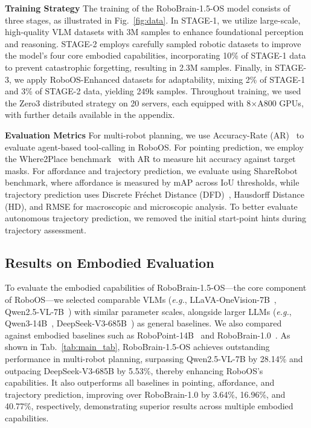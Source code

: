 \textbf{Training Strategy}  
The training of the RoboBrain-1.5-OS model consists of three stages, as illustrated in Fig.~\ref{fig:data}. In STAGE-1, we utilize large-scale, high-quality VLM datasets with 3M samples to enhance foundational perception and reasoning. STAGE-2 employs carefully sampled robotic datasets to improve the model's four core embodied capabilities, incorporating 10\% of STAGE-1 data to prevent catastrophic forgetting, resulting in 2.3M samples. Finally, in STAGE-3, we apply RoboOS-Enhanced datasets for adaptability, mixing 2\% of STAGE-1 and 3\% of STAGE-2 data, yielding 249k samples. Throughout training, we used the Zero3 \cite{zero} distributed strategy on 20 servers, each equipped with 8$\times$A800 GPUs, with further details available in the appendix.

\textbf{Evaluation Metrics} For multi-robot planning, we use Accuracy-Rate (AR)~\cite{zhang2024lmms} to evaluate agent-based tool-calling in RoboOS. For pointing prediction, we employ the Where2Place benchmark~\cite{yuan2024robopoint} with AR to measure hit accuracy against target masks. For affordance and trajectory prediction, we evaluate using ShareRobot~\cite{ji2025robobrain} benchmark, where affordance is measured by mAP across IoU thresholds, while trajectory prediction uses Discrete Fréchet Distance (DFD)~\cite{gu2023rt}, Hausdorff Distance (HD), and RMSE for macroscopic and microscopic analysis. To better evaluate autonomous trajectory prediction, we removed the initial start-point hints during trajectory assessment.

\subsection{Results on Embodied Evaluation}
To evaluate the embodied capabilities of RoboBrain-1.5-OS—the core component of RoboOS—we selected comparable VLMs (\textit{e.g.}, LLaVA-OneVision-7B~\cite{li2024llavaov}, Qwen2.5-VL-7B~\cite{Qwen2.5-VL}) with similar parameter scales, alongside larger LLMs (\textit{e.g.}, Qwen3-14B~\cite{qwen3_2025}, DeepSeek-V3-685B~\cite{liu2024deepseek}) as general baselines. We also compared against embodied baselines such as RoboPoint-14B~\cite{yuan2024robopoint} and RoboBrain-1.0~\cite{ji2025robobrain}. As shown in Tab.~\ref{tab:main_tab}, RoboBrain-1.5-OS achieves outstanding performance in multi-robot planning, surpassing Qwen2.5-VL-7B by 28.14\% and outpacing DeepSeek-V3-685B by 5.53\%, thereby enhancing RoboOS's capabilities. It also outperforms all baselines in pointing, affordance, and trajectory prediction, improving over RoboBrain-1.0 by 3.64\%, 16.96\%, and 40.77\%, respectively, demonstrating superior results across multiple embodied capabilities.

